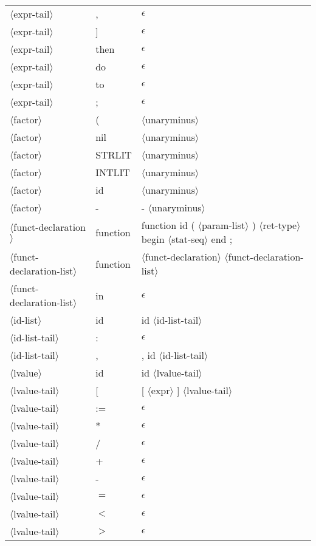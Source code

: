 \documentclass[11pt, fleqn]{article}
\newcommand{\atag}[1]{$\langle$#1$\rangle$}
\begin{document}
\begin{longtable}{l|l|l}
\atag{expr-tail}					&	,		&	$\epsilon$		\\
\atag{expr-tail}					&	]		&	$\epsilon$		\\
\atag{expr-tail}					&	then		&	$\epsilon$		\\
\atag{expr-tail}					&	do		&	$\epsilon$		\\
\atag{expr-tail}					&	to		&	$\epsilon$		\\
\atag{expr-tail}					&	;		&	$\epsilon$		\\
\atag{factor}					&	(		&	\atag{unaryminus}		\\
\atag{factor}					&	nil		&	\atag{unaryminus}		\\
\atag{factor}					&	STRLIT	&	\atag{unaryminus}		\\
\atag{factor}					&	INTLIT	&	\atag{unaryminus}		\\
\atag{factor}					&	id		&	\atag{unaryminus}		\\
\atag{factor}					&	-		&	- \atag{unaryminus}		\\
\atag{funct-declaration}			&	function		&	function id ( \atag{param-list} ) \atag{ret-type} begin \atag{stat-seq} end ;	\\
\atag{funct-declaration-list}	&	function		&	\atag{funct-declaration} \atag{funct-declaration-list}	\\
\atag{funct-declaration-list}	&	in		&	$\epsilon$	\\
\atag{id-list}					&	id		&	id \atag{id-list-tail}	\\
\atag{id-list-tail}				&	:		&	$\epsilon$	\\
\atag{id-list-tail}				&	,		&	, id \atag{id-list-tail}	\\
\atag{lvalue}					&	id		&	id \atag{lvalue-tail}			\\
\atag{lvalue-tail}				&	[		&	[ \atag{expr} ] \atag{lvalue-tail}		\\
\atag{lvalue-tail}				&	:=		&	$\epsilon$											\\
\atag{lvalue-tail}				&	*		&	$\epsilon$											\\
\atag{lvalue-tail}				&	/		&	$\epsilon$											\\
\atag{lvalue-tail}				&	+		&	$\epsilon$											\\
\atag{lvalue-tail}				&	-		&	$\epsilon$											\\
\atag{lvalue-tail}				&	$=$		&	$\epsilon$											\\
\atag{lvalue-tail}				&	$<$		&	$\epsilon$											\\
\atag{lvalue-tail}				&	$>$		&	$\epsilon$											\\

\end{longtable}
\end{document}
